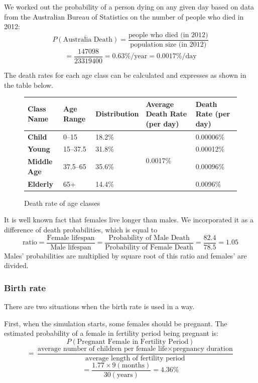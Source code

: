 \documentclass[a4paper]{article}
\newcommand*\mean[1]{\overline{#1}}
\begin{document}
We worked out the probability of a person dying on any given day based on data from the Australian Bureau of Statistics on the number of people who died in 2012\cite{absdeath}:
$$ \mean{P(\text{Australia Death})} = \frac{\text{people who died (in 2012)}}{\text{population size (in 2012)}} $$
$$ = \frac{147098}{23319400} = 0.63\%/\text{year} = 0.0017\%/\text{day} $$

The death rates for each age class can be calculated and expresses as shown in the table below.

\begin{figure}[ht]
    \centering
    \begin{tabu} {| X[1.1,c,p] || X[0.7,c,p] | X[1.2,c,p] | X[1.1,c,p] | X[1,c,p] |}
        \rowfont{\bfseries}
        \hline
        Class Name &
        Age Range &
        Distribution &
        Average Death Rate (per day) &
        Death Rate (per day) \\
        \hline
        \hline
        \textbf{Child} & 0--15 & 18.2\% &  & 0.00006\% \\
        \textbf{Young} & 15--37.5 & 31.8\% & & 0.00012\% \\
        \textbf{Middle Age} & 37.5--65 & 35.6\% & & 0.00096\% \\
        \textbf{Elderly} & 65+ & 14.4\% & & 0.0096\% \\
        \hline
    \end{tabu}
    \caption{Death rate of age classes}
\end{figure}

It is well known fact that females live longer than males.
We incorporated it as a difference of death probabilities, which is equal to
$$ \text{ratio} = \frac{\text{Female lifespan}}{\text{Male lifespan}} = \frac{\text{Probability of Male Death}}{\text{Probability of Female Death}} = \frac{82.4}{78.5} = 1.05 $$
Males' probabilities are multiplied by square root of this ratio and females' are divided.

\subsubsection{Birth rate}

There are two situations when the birth rate is used in a way.

First, when the simulation starts, some females should be pregnant.
The estimated probability of a female in fertility period being pregnant is:
$$ P(\text{Pregnant Female in Fertility Period}) $$
$$ = \frac{\text{average number of children per female life} \times \text{pregnancy duration}}{\text{average length of fertility period}} $$
$$ = \frac{1.77 \times 9 (\text{months})}{30 (\text{years})} = 4.36\% $$
\end{document}
